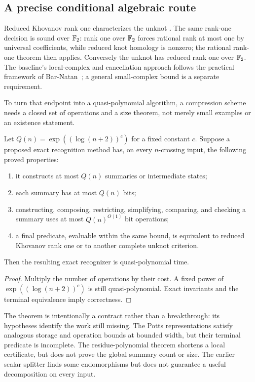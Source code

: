 \subsection{A precise conditional algebraic route}

Reduced Khovanov rank one characterizes the unknot
\cite{kronheimer2011}. The same rank-one decision is sound over $\mathbb F_2$:
rank one over $\mathbb F_2$ forces rational rank at most one by universal
coefficients, while reduced knot homology is nonzero; the rational
rank-one theorem then applies. Conversely the unknot has reduced rank one
over $\mathbb F_2$.
The baseline's local-complex and cancellation approach follows the practical
framework of Bar-Natan~\cite{barnatan2007}; a general small-complex bound
is a separate requirement.

To turn that endpoint into a quasi-polynomial algorithm, a compression
scheme needs a closed set of operations and a size theorem, not merely
small examples or an existence statement.

\begin{theorem}\label{thm:conditional}
Let $Q(n)=\exp((\log(n+2))^c)$ for a fixed constant $c$.
Suppose a proposed exact recognition method has, on every $n$-crossing
input, the following proved properties:
\begin{enumerate}
\item it constructs at most $Q(n)$ summaries or intermediate states;
\item each summary has at most $Q(n)$ bits;
\item constructing, composing, restricting, simplifying, comparing, and
checking a summary uses at most $Q(n)^{O(1)}$ bit operations;
\item a final predicate, evaluable within the same bound, is equivalent to
reduced Khovanov rank one or to another complete unknot criterion.
\end{enumerate}
Then the resulting exact recognizer is quasi-polynomial time.
\end{theorem}
\begin{proof}
Multiply the number of operations by their cost. A fixed power of
$\exp((\log(n+2))^c)$ is still quasi-polynomial. Exact invariants and the
terminal equivalence imply correctness.
\end{proof}

The theorem is intentionally a contract rather than a breakthrough: its
hypotheses identify the work still missing. The Potts representations satisfy
analogous storage and operation bounds at bounded width, but their terminal
predicate is incomplete. The residue-polynomial theorem shortens a local
certificate, but does not prove the global summary count or size. The earlier
scalar splitter finds some endomorphisms but does not guarantee a useful
decomposition on every input.

